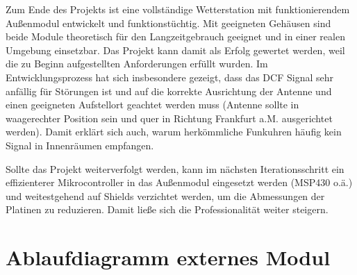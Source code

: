 \documentclass[a4paper,11pt]{article}
\begin{document}
Zum Ende des Projekts ist eine vollständige Wetterstation mit funktionierendem Außenmodul entwickelt und funktionstüchtig. Mit geeigneten Gehäusen sind beide
Module theoretisch für den Langzeitgebrauch geeignet und in einer realen Umgebung einsetzbar. Das Projekt kann damit als Erfolg gewertet werden, 
weil die zu Beginn aufgestellten Anforderungen erfüllt wurden. 
Im Entwicklungsprozess hat sich insbesondere gezeigt, dass das DCF Signal sehr anfällig für Störungen ist und auf die korrekte Ausrichtung der Antenne und einen
geeigneten Aufstellort geachtet werden muss (Antenne sollte in waagerechter Position sein und quer in Richtung Frankfurt a.M. ausgerichtet werden). Damit
erklärt sich auch, warum herkömmliche Funkuhren häufig kein Signal in Innenräumen empfangen. 

\vspace{0.2cm}
\noindent
Sollte das Projekt weiterverfolgt werden, kann im nächsten Iterationsschritt ein effizienterer Mikrocontroller in das Außenmodul eingesetzt werden (MSP430 o.ä.)
und weitestgehend auf Shields verzichtet werden, um die Abmessungen der Platinen zu reduzieren. Damit ließe sich die Professionalität weiter steigern. 

\clearpage
\appendix

\section{Ablaufdiagramm externes Modul}
\label{subapp:ablaufExt}
\end{document}
